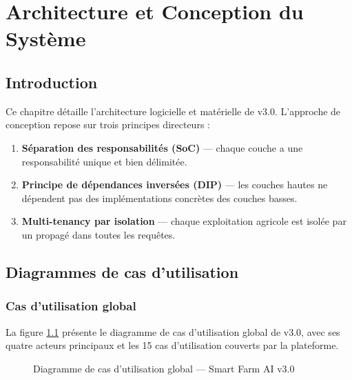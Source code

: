\chapter{Architecture et Conception du Système}
\thispagestyle{fancy}

\section{Introduction}

Ce chapitre détaille l'architecture logicielle et matérielle de \farmAI{} v3.0.
L'approche de conception repose sur trois principes directeurs :

\begin{enumerate}
  \item \textbf{Séparation des responsabilités (SoC)} — chaque couche a une
        responsabilité unique et bien délimitée.
  \item \textbf{Principe de dépendances inversées (DIP)} — les couches hautes ne
        dépendent pas des implémentations concrètes des couches basses.
  \item \textbf{Multi-tenancy par isolation} — chaque exploitation agricole est isolée
        par un  propagé dans toutes les requêtes.
\end{enumerate}

\section{Diagrammes de cas d'utilisation}

\subsection{Cas d'utilisation global}

La figure \ref{fig:uc_global} présente le diagramme de cas d'utilisation global de
\farmAI{} v3.0, avec ses quatre acteurs principaux et les 15 cas d'utilisation
couverts par la plateforme.

\begin{figure}[H]
\centering
\resizebox{\textwidth}{!}{%

}
\caption{Diagramme de cas d'utilisation global — Smart Farm AI v3.0}
\label{fig:uc_global}
\end{figure}

